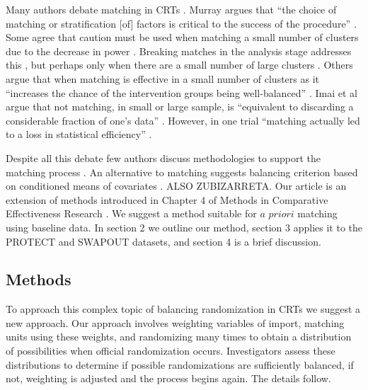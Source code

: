 \documentclass[]{sagej}
\begin{document}
Many authors debate matching in CRTs
\citep{balzer2012match, CRTrials2009, gatsonis2017methods, diehr1995breaking, murray1998design, imai2009essential, PMVsStrat, donner2007merits, klar1997merits, donner2000design, martin1993effect}.
Murray argues that ``the choice of matching or stratification {[}of{]}
factors is critical to the success of the procedure''
\citep{murray1998design}. Some agree that caution must be used when
matching a small number of clusters due to the decrease in power
\citep{donner2000design, klar1997merits, balzer2012match, martin1993effect}.
Breaking matches in the analysis stage addresses this
\citep{diehr1995breaking}, but perhaps only when there are a small
number of large clusters \citep{donner2007merits}. Others argue that
when matching is effective in a small number of clusters as it
``increases the chance of the intervention groups being well-balanced''
\citep{donner2007merits}. Imai et al argue that not matching, in small
or large sample, is ``equivalent to discarding a considerable fraction
of one's data'' \citep{imai2009essential}. However, in one trial
``matching actually led to a loss in statistical efficiency''
\citep[\citet{donner2000design}]{manun1994influence}.

Despite all this debate few authors discuss methodologies to support the
matching process \citep{raab2001balance}. An alternative to matching
suggests balancing criterion based on conditioned means of covariates
\citep{raab2001balance}. ALSO ZUBIZARRETA. Our article is an extension
of methods introduced in Chapter 4 of Methods in Comparative
Effectiveness Research \citep{gatsonis2017methods}. We suggest a method
suitable for \(a\) \(priori\) matching using baseline data. In section 2
we outline our method, section 3 applies it to the PROTECT and SWAPOUT
datasets, and section 4 is a brief discussion.

\subsection{Methods }\label{methods}

To approach this complex topic of balancing randomization in CRTs we
suggest a new approach. Our approach involves weighting variables of
import, matching units using these weights, and randomizing many times
to obtain a distribution of possibilities when official randomization
occurs. Investigators assess these distributions to determine if
possible randomizations are sufficiently balanced, if not, weighting is
adjusted and the process begins again. The details follow.
\end{document}
